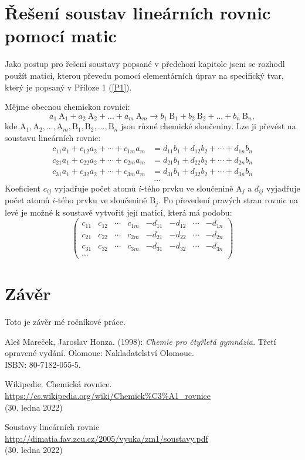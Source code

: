 \documentclass[12pt,a4paper]{report}
\newcommand{\n}[1]{\mbox{#1}}
\newcommand{\sipka}{\rightarrow}
\begin{document}
\chapter{Řešení soustav lineárních rovnic pomocí matic}
Jako postup pro řešení soustavy popsané v předchozí kapitole jsem se rozhodl použít matici, kterou převedu pomocí elementárních úprav na specifický tvar, který je popsaný v Příloze 1 (\ref{P1}).

Mějme obecnou chemickou rovnici:
$$a_1~\n{A}_1 + a_2~\n{A}_2 + ... + a_m~\n{A}_m \sipka b_1~\n{B}_1 + b_2~\n{B}_2 + ...+ b_n~\n{B}_n,$$
kde $\n{A}_1, \n{A}_2, ..., \n{A}_m, \n{B}_1, \n{B}_2, ..., \n{B}_n$ jsou různé chemické sloučeniny. Lze ji převést na soustavu lineárních rovnic:
\begin{align*}
	c_{11}a_{1} + c_{12}a_{2} + \cdots + c_{1m}a_{m} &= d_{11}b_{1} + d_{12}b_{2} + \cdots + d_{1n}b_{n}\\
	c_{21}a_{1} + c_{22}a_{2} + \cdots + c_{2m}a_{m} &= d_{21}b_{1} + d_{22}b_{2} + \cdots + d_{2n}b_{n}\\
	c_{31}a_{1} + c_{32}a_{2} + \cdots + c_{3m}a_{m} &= d_{31}b_{1} + d_{32}b_{2} + \cdots + d_{3n}b_{n}\\
	&~...
\end{align*}
Koeficient $ c_{ij} $ vyjadřuje počet atomů $ i $-tého prvku ve sloučenině A$ _j $ a $ d_{ij} $ vyjadřuje počet atomů $ i $-tého prvku ve sloučenině B$ _j $. Po převedení pravých stran rovnic na levé je možné k soustavě vytvořit její matici, která má podobu:
$$\begin{pmatrix}
	c_{11} & c_{12} & \cdots & c_{1m} & -d_{11} & -d_{12} &\cdots& -d_{1n}\\
	c_{21} & c_{22} & \cdots & c_{2m} & -d_{21} & -d_{22} &\cdots& -d_{2n}\\
	c_{31} & c_{32} & \cdots & c_{3m} & -d_{31} & -d_{32} &\cdots& -d_{3n}\\
	\cdots
\end{pmatrix}$$


\chapter{Závěr}
Toto je závěr mé ročníkové práce.

\begin{thebibliography}{99}

Aleš Mareček, Jaroslav Honza. (1998): \textit{Chemie pro čtyřletá gymnázia.} Třetí opravené vydání. Olomouc: Nakladatelství Olomouc.\\
ISBN: 80-7182-055-5.

Wikipedie. Chemická rovnice.\\
\url{https://cs.wikipedia.org/wiki/Chemick\%C3\%A1_rovnice}\\
(30. ledna 2022)

Soustavy lineárních rovnic\\
\url{http://dimatia.fav.zcu.cz/2005/vyuka/zm1/soustavy.pdf}\\
(30. ledna 2022)
\end{thebibliography}
\end{document}
